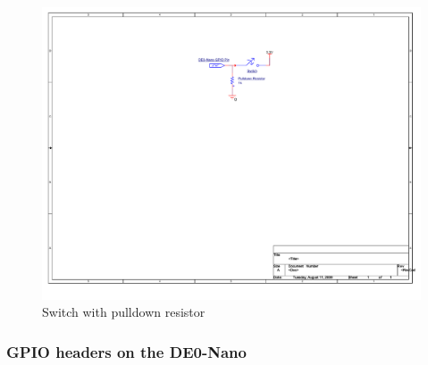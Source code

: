       \begin{figure}[htpb]
        \label{swPulldown}
        \includegraphics[width=.38\textwidth]{Schematics/SwitchCircuit.pdf}
        \caption{Switch with pulldown resistor}
      \end{figure}

      \subsubsection{GPIO headers on the DE0-Nano} 
